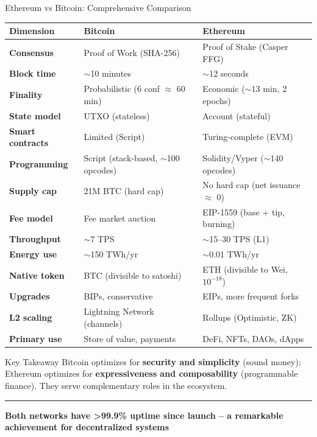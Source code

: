 \documentclass[8pt,aspectratio=169]{beamer}
\newcommand{\bottomnote}[1]{\vfill\vspace{-2mm}\textcolor{mllavender2}{\rule{\textwidth}{0.4pt}}\vspace{1mm}\footnotesize\textbf{#1}}
\begin{document}
\begin{frame}{Ethereum vs Bitcoin: Comprehensive Comparison}
\begin{center}
\small
\begin{tabular}{@{}lll@{}}
\toprule
\textbf{Dimension} & \textbf{Bitcoin} & \textbf{Ethereum} \\
\midrule
\textbf{Consensus} & Proof of Work (SHA-256) & Proof of Stake (Casper FFG) \\
\textbf{Block time} & $\sim$10 minutes & $\sim$12 seconds \\
\textbf{Finality} & Probabilistic (6 conf $\approx$ 60 min) & Economic ($\sim$13 min, 2 epochs) \\
\textbf{State model} & UTXO (stateless) & Account (stateful) \\
\textbf{Smart contracts} & Limited (Script) & Turing-complete (EVM) \\
\textbf{Programming} & Script (stack-based, $\sim$100 opcodes) & Solidity/Vyper ($\sim$140 opcodes) \\
\textbf{Supply cap} & 21M BTC (hard cap) & No hard cap (net issuance $\approx$ 0) \\
\textbf{Fee model} & Fee market auction & EIP-1559 (base + tip, burning) \\
\textbf{Throughput} & $\sim$7 TPS & $\sim$15--30 TPS (L1) \\
\textbf{Energy use} & $\sim$150 TWh/yr & $\sim$0.01 TWh/yr \\
\textbf{Native token} & BTC (divisible to satoshi) & ETH (divisible to Wei, $10^{-18}$) \\
\textbf{Upgrades} & BIPs, conservative & EIPs, more frequent forks \\
\textbf{L2 scaling} & Lightning Network (channels) & Rollups (Optimistic, ZK) \\
\textbf{Primary use} & Store of value, payments & DeFi, NFTs, DAOs, dApps \\
\bottomrule
\end{tabular}
\end{center}
\vspace{2mm}
\begin{alertblock}{Key Takeaway}
\small Bitcoin optimizes for \textbf{security and simplicity} (sound money); Ethereum optimizes for \textbf{expressiveness and composability} (programmable finance). They serve complementary roles in the ecosystem.
\end{alertblock}
\bottomnote{Both networks have >99.9\% uptime since launch -- a remarkable achievement for decentralized systems}
\end{frame}
\end{document}
